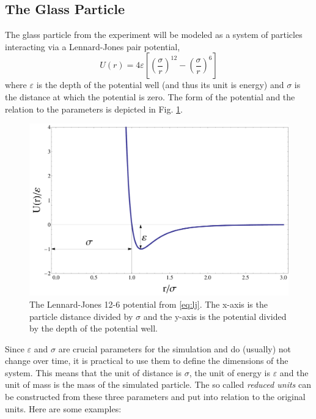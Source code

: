 \documentclass[12pt]{article}
\begin{document}
\subsection{The Glass Particle}
The glass particle from the experiment will be modeled as a system of particles interacting via a Lennard-Jones pair potential, 
\begin{equation}
    \label{eq:lj}
    U(r) = 4\varepsilon\left[\left(\frac\sigma r\right)^{12} - \left(\frac\sigma r\right)^6\right]
\end{equation}
where $\varepsilon$ is the depth of the potential well (and thus its unit is energy) and $\sigma$ is the distance at which the potential is zero. 
The form of the potential and the relation to the parameters is depicted in Fig. \ref{fig:lj}.
\begin{figure}[h]
    \begin{center}
        \includegraphics[scale=0.2]{images/LJ-2.pdf}
        \caption{The Lennard-Jones 12-6 potential from \eqref{eq:lj}. The x-axis is the particle distance divided by $\sigma$ and  the y-axis is the
        potential divided by the depth of the potential well.}
        \label{fig:lj}
    \end{center}
\end{figure}
Since $\varepsilon$ and $\sigma$ are crucial parameters for the simulation and do (usually) not change over time, it is practical to use them to
define the dimensions of the system. This means that the unit of distance is $\sigma$, the unit of energy is $\varepsilon$ and the unit of mass is 
the mass of the simulated particle. The so called \textit{reduced units} can be constructed from these three parameters and put into relation to the
original units. Here are some examples:
\end{document}
